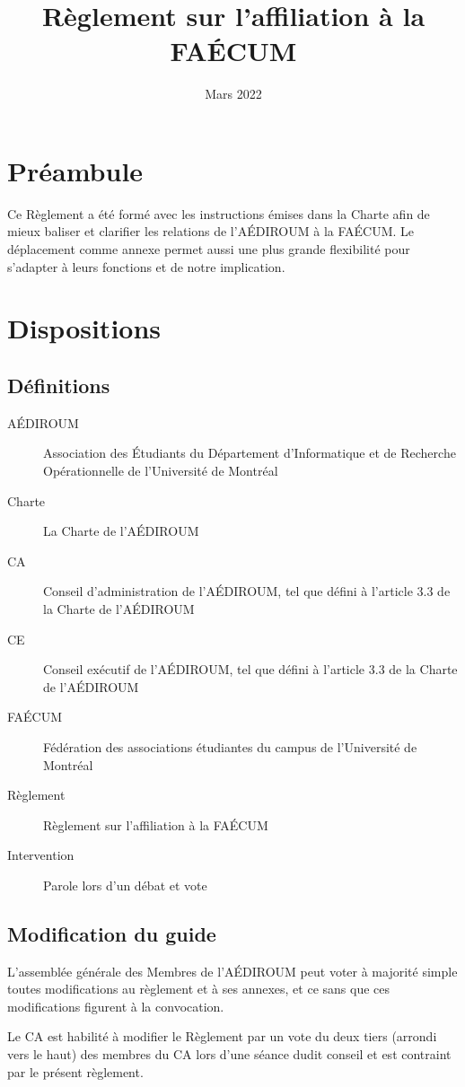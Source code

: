 \documentclass{aediroum}
\title{Règlement sur l'affiliation à la FAÉCUM}
\date{Mars 2022}
\begin{document}
\maketitle

\section{Préambule}
Ce Règlement a été formé avec les instructions émises dans la Charte afin de mieux baliser et clarifier les relations de l'AÉDIROUM à la FAÉCUM. Le déplacement comme annexe permet aussi une plus grande flexibilité pour s'adapter à leurs fonctions et de notre implication.

\section{Dispositions}

\subsection{Définitions}
\begin{description}
	\item[AÉDIROUM] Association des Étudiants du Département d'Informatique et de Recherche Opérationnelle de l'Université de Montréal
	\item[Charte] La Charte de l'AÉDIROUM
	\item[CA] Conseil d'administration de l'AÉDIROUM, tel que défini à l'article 3.3 de la Charte de l'AÉDIROUM
	\item[CE] Conseil exécutif de l'AÉDIROUM, tel que défini à l'article 3.3 de la Charte de l'AÉDIROUM
	\item[FAÉCUM] Fédération des associations étudiantes du campus de l'Université de Montréal
	\item[Règlement] Règlement sur l'affiliation à la FAÉCUM
	\item[Intervention] Parole lors d'un débat et vote
\end{description}

\subsection{Modification du guide}
L'assemblée générale des Membres de l'AÉDIROUM peut voter à majorité simple toutes modifications au règlement et à ses annexes, et ce sans que ces modifications figurent à la convocation.

Le CA est habilité à modifier le Règlement par un vote du deux tiers (arrondi vers le haut) des membres du CA lors d'une séance dudit conseil et est contraint par le présent règlement.
\end{document}
